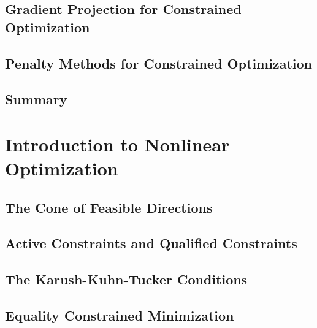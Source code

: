 \documentclass[a4paper]{article}
\begin{document}
\subsection{ Gradient Projection for Constrained Optimization} %

\subsection{ Penalty Methods for Constrained Optimization} %

\subsection{ Summary} %


\newpage
\section{Introduction to Nonlinear Optimization}
\subsection{ The Cone of Feasible Directions} %

\subsection{ Active Constraints and Qualified Constraints} %

\subsection{ The Karush-Kuhn-Tucker Conditions} %

\subsection{ Equality Constrained Minimization} %
\end{document}
